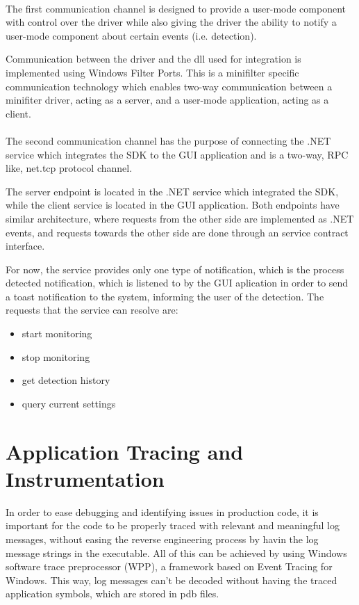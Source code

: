         \paragraph{}
        The first communication channel is designed to provide a user-mode component with control over the driver while also giving the driver
        the ability to notify a user-mode component about certain events (i.e. detection).
        
        Communication between the driver and the dll used for integration is implemented using Windows Filter Ports. This is a minifilter
        specific communication technology which enables two-way communication between a minifiter driver, acting as a server, and a user-mode
        application, acting as a client.

        \paragraph{}
        The second communication channel has the purpose of connecting the .NET service which integrates the SDK to the GUI application and is
        a two-way, RPC like, net.tcp protocol channel.

        The server endpoint is located in the .NET service which integrated the SDK, while the client service is located in the GUI application.
        Both endpoints have similar architecture, where requests from the other side are implemented as .NET events, and requests towards the other
        side are done through an service contract interface.

        For now, the service provides only one type of notification, which is the process detected notification, which is listened to by the GUI
        aplication in order to send a toast notification to the system, informing the user of the detection.
        The requests that the service can resolve are:
        
        \begin{itemize}
            \item start monitoring
            \item stop monitoring
            \item get detection history
            \item query current settings
        \end{itemize}

    \section{Application Tracing and Instrumentation}
        In order to ease debugging and identifying issues in production code, it is important for the code to be properly traced with relevant
        and meaningful log messages, without easing the reverse engineering process by havin the log message strings in the executable. All of
        this can be achieved by using Windows software trace preprocessor (WPP), a framework based on Event Tracing for Windows. This way, 
        log messages can't be decoded without having the traced application symbols, which are stored in pdb files.

